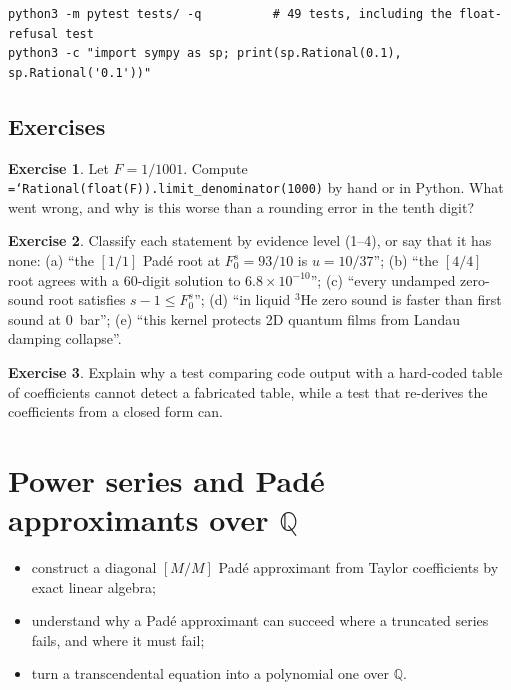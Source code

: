 \documentclass[11pt,a4paper,openany]{book}
\newcommand{\Fzs}{F_0^{s}}
\newcommand{\code}[1]{\texttt{\hyphenchar\font=`\-\relax #1}}
\newcommand{\Q}{\mathbb{Q}}
\theoremstyle{definition}
\newtheorem{exercise}{Exercise}[chapter]
\theoremstyle{plain}
\begin{document}
\begin{runit}
\begin{verbatim}
python3 -m pytest tests/ -q          # 49 tests, including the float-refusal test
python3 -c "import sympy as sp; print(sp.Rational(0.1), sp.Rational('0.1'))"
\end{verbatim}
\end{runit}

\section*{Exercises}
\begin{exercise}\label{ex:float-roundtrip}
Let $F=1/1001$. Compute \code{Rational(float(F)).limit\_denominator(1000)} by hand or in
Python. What went wrong, and why is this worse than a rounding error in the tenth digit?
\end{exercise}
\begin{exercise}\label{ex:levels}
Classify each statement by evidence level (1--4), or say that it has none:
(a) ``the $[1/1]$ Padé root at $\Fzs=93/10$ is $u=10/37$'';
(b) ``the $[4/4]$ root agrees with a 60-digit solution to $6.8\times10^{-10}$'';
(c) ``every undamped zero-sound root satisfies $s-1\le\Fzs$'';
(d) ``in liquid $^3$He zero sound is faster than first sound at 0~bar'';
(e) ``this kernel protects 2D quantum films from Landau damping collapse''.
\end{exercise}
\begin{exercise}\label{ex:tabletest}
Explain why a test comparing code output with a hard-coded table of coefficients cannot detect a
fabricated table, while a test that re-derives the coefficients from a closed form can.
\end{exercise}

\chapter{Power series and Padé approximants over \texorpdfstring{$\mathbb{Q}$}{Q}}
\label{ch:pade}

\begin{objectives}
\begin{itemize}
  \item construct a diagonal $[M/M]$ Padé approximant from Taylor coefficients by exact linear
        algebra;
  \item understand why a Padé approximant can succeed where a truncated series fails, and where
        it must fail;
  \item turn a transcendental equation into a polynomial one over $\Q$.
\end{itemize}
\end{objectives}
\end{document}
